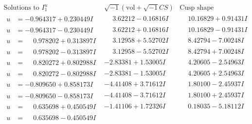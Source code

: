 \documentclass[1p]{elsarticle_modified}
\theoremstyle{definition}
\newcommand{\I}{\sqrt{-1}}
\begin{document}
$$\begin{array}{c|c|c}  
\text{Solutions to }I^u_{1}& \I (\text{vol} + \sqrt{-1}CS) & \text{Cusp shape}\\
 \hline 
\begin{aligned}
u &= -0.964317 + 0.230449 I\end{aligned}
 & \phantom{-}3.62212 - 0.16816 I & \phantom{-}10.16829 + 0.91431 I \\ \hline\begin{aligned}
u &= -0.964317 - 0.230449 I\end{aligned}
 & \phantom{-}3.62212 + 0.16816 I & \phantom{-}10.16829 - 0.91431 I \\ \hline\begin{aligned}
u &= \phantom{-}0.978202 + 0.313897 I\end{aligned}
 & \phantom{-}3.12958 + 5.52702 I & \phantom{-}8.42794 - 7.00248 I \\ \hline\begin{aligned}
u &= \phantom{-}0.978202 - 0.313897 I\end{aligned}
 & \phantom{-}3.12958 - 5.52702 I & \phantom{-}8.42794 + 7.00248 I \\ \hline\begin{aligned}
u &= \phantom{-}0.820272 + 0.802988 I\end{aligned}
 & -2.83381 + 1.53005 I & \phantom{-}4.20605 - 2.54963 I \\ \hline\begin{aligned}
u &= \phantom{-}0.820272 - 0.802988 I\end{aligned}
 & -2.83381 - 1.53005 I & \phantom{-}4.20605 + 2.54963 I \\ \hline\begin{aligned}
u &= -0.809650 + 0.858173 I\end{aligned}
 & -4.41408 + 3.71612 I & \phantom{-}1.80100 - 2.45937 I \\ \hline\begin{aligned}
u &= -0.809650 - 0.858173 I\end{aligned}
 & -4.41408 - 3.71612 I & \phantom{-}1.80100 + 2.45937 I \\ \hline\begin{aligned}
u &= \phantom{-}0.635698 + 0.450549 I\end{aligned}
 & -1.41106 + 1.72326 I & \phantom{-}0.18035 - 5.18112 I \\ \hline\begin{aligned}
u &= \phantom{-}0.635698 - 0.450549 I\end{aligned}

\end{array}$$
\end{document}
